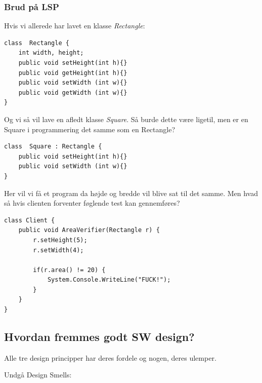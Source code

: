 \subsubsection{Brud på LSP}
Hvis vi allerede har lavet en klasse \textit{Rectangle}:

\begin{lstlisting}
class  Rectangle {
	int width, height;
	public void setHeight(int h){}
	public void getHeight(int h){}
	public void setWidth (int w){}
	public void getWidth (int w){}
}
\end{lstlisting}

Og vi så vil lave en afledt klasse \textit{Square}. Så burde dette være ligetil, men er en Square i programmering det samme som en Rectangle?

\begin{lstlisting}
class  Square : Rectangle {
	public void setHeight(int h){}
	public void setWidth (int w){}
}
\end{lstlisting}

Her vil vi få et program da højde og bredde vil blive sat til det samme. Men hvad så hvis clienten forventer føglende test kan gennemføres?

\begin{lstlisting}
class Client {
	public void AreaVerifier(Rectangle r) {
		r.setHeight(5);
		r.setWidth(4);
		
		if(r.area() != 20) {
			System.Console.WriteLine("FUCK!");
		}
	}
}
\end{lstlisting}



\subsection{Hvordan fremmes godt SW design?}

Alle tre design principper har deres fordele og nogen, deres ulemper.

Undgå Design Smells:

